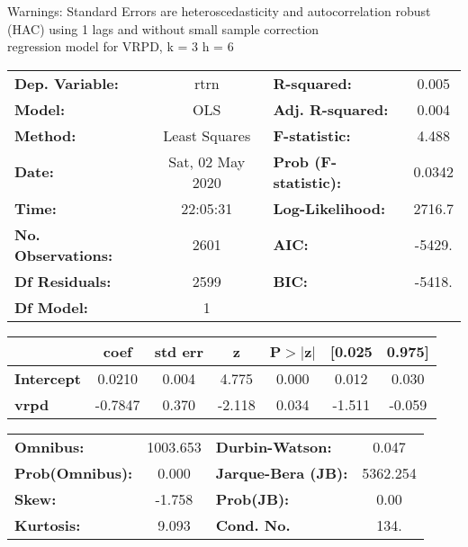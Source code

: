 Warnings: \newline
 [1] Standard Errors are heteroscedasticity and autocorrelation robust (HAC) using 1 lags and without small sample correction\\ 

regression model for VRPD, k = 3 h = 6\begin{center}
\begin{tabular}{lclc}
\toprule
\textbf{Dep. Variable:}    &       rtrn       & \textbf{  R-squared:         } &     0.005   \\
\textbf{Model:}            &       OLS        & \textbf{  Adj. R-squared:    } &     0.004   \\
\textbf{Method:}           &  Least Squares   & \textbf{  F-statistic:       } &     4.488   \\
\textbf{Date:}             & Sat, 02 May 2020 & \textbf{  Prob (F-statistic):} &   0.0342    \\
\textbf{Time:}             &     22:05:31     & \textbf{  Log-Likelihood:    } &    2716.7   \\
\textbf{No. Observations:} &        2601      & \textbf{  AIC:               } &    -5429.   \\
\textbf{Df Residuals:}     &        2599      & \textbf{  BIC:               } &    -5418.   \\
\textbf{Df Model:}         &           1      & \textbf{                     } &             \\
\bottomrule
\end{tabular}
\begin{tabular}{lcccccc}
                   & \textbf{coef} & \textbf{std err} & \textbf{z} & \textbf{P$> |$z$|$} & \textbf{[0.025} & \textbf{0.975]}  \\
\midrule
\textbf{Intercept} &       0.0210  &        0.004     &     4.775  &         0.000        &        0.012    &        0.030     \\
\textbf{vrpd}      &      -0.7847  &        0.370     &    -2.118  &         0.034        &       -1.511    &       -0.059     \\
\bottomrule
\end{tabular}
\begin{tabular}{lclc}
\textbf{Omnibus:}       & 1003.653 & \textbf{  Durbin-Watson:     } &    0.047  \\
\textbf{Prob(Omnibus):} &   0.000  & \textbf{  Jarque-Bera (JB):  } & 5362.254  \\
\textbf{Skew:}          &  -1.758  & \textbf{  Prob(JB):          } &     0.00  \\
\textbf{Kurtosis:}      &   9.093  & \textbf{  Cond. No.          } &     134.  \\
\bottomrule
\end{tabular}
\end{center}

